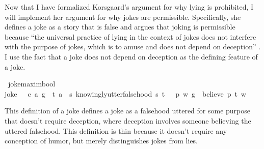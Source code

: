 \begin{isabellebody}
\begin{isamarkuptext}
Now that I have formalized Korsgaard's argument for why lying is prohibited, I will
implement her argument for why jokes are permissible. Specifically, she defines a joke as a story that is 
false and argues that joking is permissible because ``the universal practice of lying in the context of jokes
does not interfere with the purpose of jokes, which is to amuse and does not depend on
deception'' \citep[4]{KorsgaardRTL}. I use the fact that a joke does not depend on deception as the 
defining feature of a joke.%
\end{isamarkuptext}\isamarkuptrue%
\isamarkupfalse%
\ joke{\isacharcolon}{\isacharcolon}{\isachardoublequoteopen}maxim{\isasymRightarrow}bool{\isachardoublequoteclose}\ \ \isanewline
{\isachardoublequoteopen}joke\ {\isasymequiv}\ {\isasymlambda}\ {\isacharparenleft}c{\isacharcomma}\ a{\isacharcomma}\ g{\isacharparenright}{\isachardot}\ \ {\isasymexists}t{\isachardot}\ {\isacharparenleft}a\ \isactrlbold {\isasymlongrightarrow}\ {\isacharparenleft}{\isasymlambda}s{\isachardot}\ knowingly{\isacharunderscore}utter{\isacharunderscore}falsehood\ s\ t{\isacharparenright}{\isacharparenright}\ {\isasymand}\ {\isasymnot}\ {\isacharparenleft}{\isasymexists}p{\isachardot}\ {\isasymforall}w{\isachardot}\ {\isacharparenleft}g\ \isactrlbold {\isasymrightarrow}\ {\isacharparenleft}believe\ p\ t{\isacharparenright}{\isacharparenright}\ w{\isacharparenright}{\isachardoublequoteclose}\isanewline
%
%
\begin{isamarkuptext}%
This definition of a joke defines a joke as a falsehood uttered for some purpose that 
doesn't require deception, where deception involves someone believing the uttered falsehood. 
This definition is thin because it doesn't require any conception of humor, but merely
distinguishes jokes from lies. 


\end{isamarkuptext}
\end{isabellebody}
